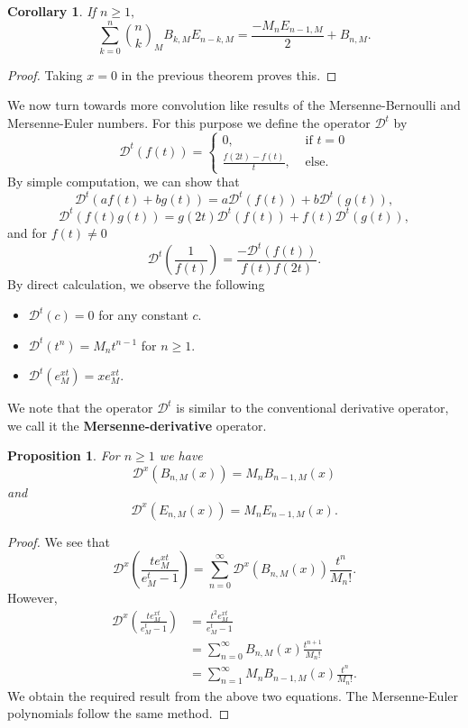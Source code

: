 \documentclass[12pt, a4paper]{article}
\newtheorem{proposition}[theorem]{Proposition}
\newtheorem{corollary}[theorem]{Corollary}
\begin{document}
\begin{corollary}
If $n \geq 1,$
\begin{equation*}
\sum_{k=0}^{n}\binom{n}{k}_MB_{k,M}E_{n-k,M} = \frac{-M_nE_{n-1,M}}{2}+B_{n,M}.
\end{equation*}
\end{corollary}
\begin{proof}
Taking $x=0$ in the previous theorem proves this.
\end{proof}
We now turn towards more convolution like results of the Mersenne-Bernoulli and Mersenne-Euler numbers. For this purpose we define the operator $\mathcal{D}^t$ by
\begin{equation}
\mathcal{D}^t\left(f(t)\right)= 
\begin{cases}
0, & \text{~if~} t = 0\\
\frac{f(2t)-f(t)}{t}, & \text{~else.}
\end{cases}
\end{equation}
By simple computation, we can show that
\[\mathcal{D}^t\left(af(t)+bg(t)\right)= a\mathcal{D}^t\left(f(t)\right)+b\mathcal{D}^t\left(g(t)\right),\]
\[\mathcal{D}^t\left(f(t)g(t)\right)= g(2t)\mathcal{D}^t\left(f(t)\right)+f(t)\mathcal{D}^t\left(g(t)\right),\]
and for $f(t) \neq 0$
\[\mathcal{D}^t\left(\frac{1}{f(t)}\right) = \frac{-\mathcal{D}^t\left(f(t)\right)}{f(t)f(2t)}.\]
By direct calculation, we observe the following
\begin{itemize}
\item[i.]$\mathcal{D}^t(c) = 0$ for any constant $c.$
\item[ii.]$\mathcal{D}^t(t^n) = M_nt^{n-1}$ for $n \geq 1.$
\item[iii.]$\mathcal{D}^t(e^{xt}_M) = xe^{xt}_M.$
\end{itemize}
We note that the operator $\mathcal{D}^t$ is similar to the conventional derivative operator, we call it the \textbf{Mersenne-derivative} operator.
\begin{proposition} \label{prop:2_9}
For $n \geq 1$ we have 
\begin{equation*} \label{eq:DB}
\mathcal{D}^x(B_{n,M}(x)) = M_nB_{n-1,M}(x)
\end{equation*}
and
\begin{equation*} \label{eq:DE}
\mathcal{D}^x(E_{n,M}(x)) = M_nE_{n-1,M}(x).
\end{equation*}
\end{proposition}
\begin{proof}
We see that
\[\mathcal{D}^x\left(\frac{te^{xt}_M}{e^t_M-1}\right)= \sum_{n=0}^{\infty}\mathcal{D}^x(B_{n,M}(x))\frac{t^n}{M_n!}.\]
However,
\begin{align*}
\mathcal{D}^x\left(\frac{te^{xt}_M}{e^t_M-1}\right) &= \frac{t^2e^{xt}_M}{e^t_M-1}\\
&= \sum_{n=0}^{\infty}B_{n,M}(x)\frac{t^{n+1}}{M_n!}\\
&= \sum_{n=1}^{\infty}M_nB_{n-1,M}(x)\frac{t^{n}}{M_n!}.
\end{align*}
We obtain the required result from the above two equations.
The Mersenne-Euler polynomials follow the same method.
\end{proof}
\end{document}
